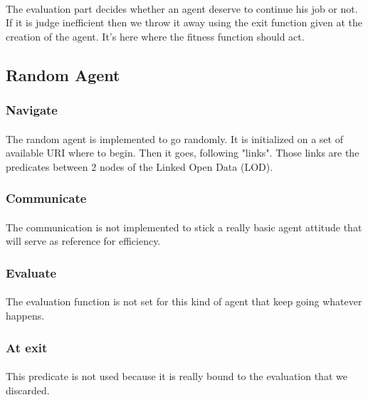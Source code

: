 \documentclass{article}
\begin{document}
	\paragraph{}
		The evaluation part decides whether an agent deserve to continue his job or not.
		If it is judge inefficient then we throw it away using the exit function given at the creation of the agent.
		It's here where the fitness function should act.
	\subsection{Random Agent}
		\subsubsection{Navigate}
			\paragraph{}
			The random agent is implemented to go randomly.
			It is initialized on a set of available URI where to begin.
			Then it goes, following "links".
			Those links are the predicates between 2 nodes of the Linked Open Data (LOD).
		\subsubsection{Communicate}
			\paragraph{}
			The communication is not implemented to stick a really basic agent attitude that will serve as reference for efficiency.
		\subsubsection{Evaluate}
			\paragraph{}
			The evaluation function is not set for this kind of agent that keep going whatever happens.
		\subsubsection{At exit}
			\paragraph{}
			This predicate is not used because it is really bound to the evaluation that we discarded.
\end{document}
